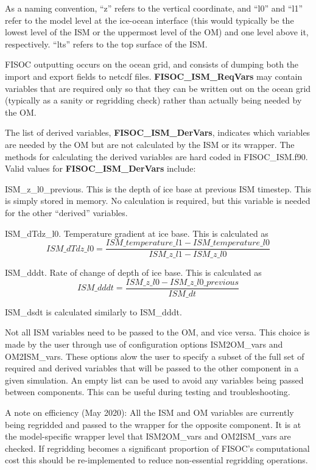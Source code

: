 \documentclass[11pt]{article}
\begin{document}
As a naming convention, ``z'' refers to the vertical coordinate, and ``l0'' and ``l1'' refer to the 
model level at the ice-ocean interface (this would typically be the lowest level of the ISM or 
the uppermost level of the OM) and one level above it, respectively. ``lts'' refers to the top 
surface of the ISM.

FISOC outputting occurs on the ocean grid, and consists of dumping both the import and 
export fields to netcdf files. 
\textbf{FISOC\_ISM\_ReqVars} may contain variables that are required only so that they can be written 
out on the ocean grid (typically as a sanity or regridding check) rather 
than actually being needed by the OM.

The list of derived variables, \textbf{FISOC\_ISM\_DerVars}, indicates which variables are needed by the 
OM but are not calculated by the ISM or its wrapper. 
The methods for calculating the derived variables are hard coded in FISOC\_ISM.f90. 
Valid values for  \textbf{FISOC\_ISM\_DerVars} include:

ISM\_z\_l0\_previous.  This is the depth of ice base at previous ISM timestep. This is simply stored 
in memory.  No calculation is required, but this variable is needed for the other ``derived'' variables. 

ISM\_dTdz\_l0.  Temperature gradient at ice base.  This is calculated as 
\begin{equation}
ISM\_dTdz\_l0 = \frac{ISM\_temperature\_l1 - ISM\_temperature\_l0}{ISM\_z\_l1 - ISM\_z\_l0}
\end{equation}

ISM\_dddt.  Rate of change of depth of ice base.  This is calculated as 
\begin{equation}
ISM\_dddt = \frac{ISM\_z\_l0 - ISM\_z\_l0\_previous}{ISM\_dt}
\end{equation}

ISM\_dsdt is calculated similarly to ISM\_dddt.

Not all ISM variables need to be passed to the OM, and vice versa.  
This choice is made by the 
user through use of configuration options ISM2OM\_vars and OM2ISM\_vars.  
These options alow the user to specify a subset of the full set of 
required and derived variables that will be passed to the other component 
in a given simulation.  An empty list can be used to avoid any variables 
being passed between components.  This can be useful during testing and 
troubleshooting.

A note on efficiency (May 2020): 
All the ISM and OM variables are currently being regridded and passed 
to the wrapper for the opposite component.  It is at the model-specific 
wrapper level that ISM2OM\_vars and OM2ISM\_vars are checked.  If regridding 
becomes a significant proportion of FISOC's computational cost this 
should be re-implemented to reduce non-essential regridding operations.
\end{document}
